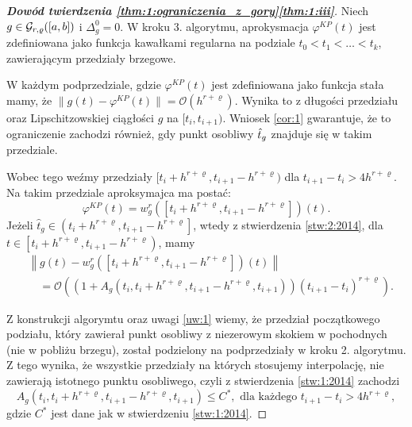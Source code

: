 \documentclass[oik, pdftex, man]{mgrwms}
\begin{document}
    \begin{proof}[\textbf{Dowód twierdzenia \ref{thm:1:ograniczenia_z_gory}\ref{thm:1:iii}}]
        Niech $g \in \mathcal{G}_{r,\varrho}([a,b])$ i $\Delta_{g}^{0} = 0$. W kroku 3. algorytmu, aprokysmacja $\varphi^{KP}(t)$ jest zdefiniowana jako funkcja kawałkami regularna na podziale $t_{0} < t_{1} < \ldots < t_{k}$, zawierającym przedziały brzegowe.
        
        W każdym podprzedziale, gdzie $\varphi^{KP}(t)$ jest zdefiniowana jako funkcja stała mamy, że $\|g(t) - \varphi^{KP}(t)\| = \mathcal{O}(h^{r+\varrho})$. Wynika to z długości przedziału oraz Lipschitzowskiej ciągłości $g$ na $[t_{i}, t_{i+1})$. Wniosek \ref{cor:1} gwarantuje, że to ograniczenie zachodzi również, gdy punkt osobliwy $\hat{t}_{g}$ znajduje się w takim przedziale.

        Wobec tego weźmy przedziały $[t_{i} + h^{r+\varrho}, t_{i+1} - h^{r+\varrho})$ dla $t_{i+1}-t_{i} > 4h^{r+\varrho}$. Na takim przedziale aproksymajca ma postać:
        \begin{equation*}
            \varphi^{KP}(t)=w_{g}^{r}\left(\left[t_{i}+h^{r+\varrho}, t_{i+1}-h^{r+\varrho}\right]\right)(t).
        \end{equation*}
        Jeżeli $\hat{t}_{g} \in\left(t_{i}+h^{r+\varrho}, t_{i+1}-h^{r+\varrho}\right]$, wtedy z stwierdzenia \ref{stw:2:2014}, dla $t \in\left[t_{i}+h^{r+\varrho}, t_{i+1}-h^{r+\varrho}\right)$, mamy
        \begin{equation*}
            \begin{aligned}
                &\left\|g(t)-w_{g}^{r}\left(\left[t_{i}+h^{r+\varrho}, t_{i+1}-h^{r+\varrho}\right]\right)(t)\right\| \\
                &\quad=\mathcal{O}\left(\left(1+A_{g}\left(t_{i}, t_{i}+h^{r+\varrho}, t_{i+1}-h^{r+\varrho}, t_{i+1}\right)\right)\left(t_{i+1}-t_{i}\right)^{r+\varrho}\right).
            \end{aligned}                            
        \end{equation*}

        Z konstrukcji algorymtu oraz uwagi \ref{uw:1} wiemy, że przedział początkowego podziału, który zawierał punkt osobliwy z niezerowym skokiem w pochodnych (nie w pobliżu brzegu), został podzielony na podprzedziały w kroku 2. algorytmu. Z tego wynika, że wszystkie przedziały na których stosujemy interpolację, nie zawierają istotnego punktu osobliwego, czyli z stwierdzenia \ref{stw:1:2014} zachodzi
        \begin{equation*}
            A_{g}\left(t_{i}, t_{i}+h^{r+\varrho}, t_{i+1}-h^{r+\varrho}, t_{i+1}\right) \leq C^{*}, \text{ dla każdego } t_{i+1} - t_{i} > 4h^{r+\varrho},
        \end{equation*}
        gdzie $C^{*}$ jest dane jak w stwierdzeniu \ref{stw:1:2014}.


\end{proof}
\end{document}
